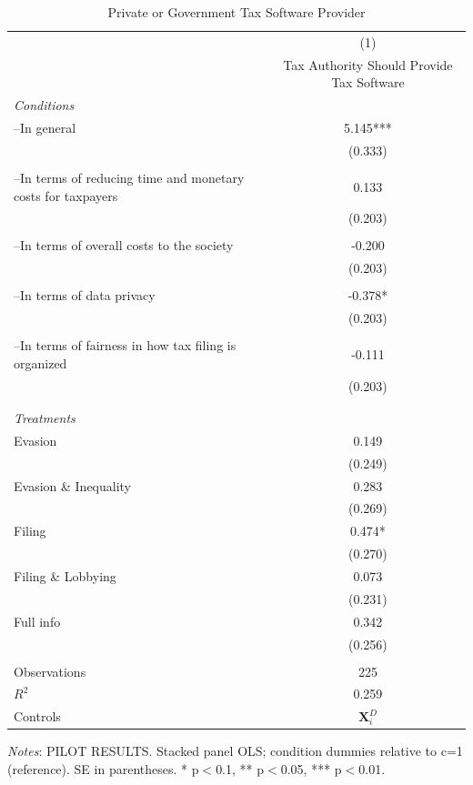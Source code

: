 \documentclass[11pt]{article}
\begin{document}
\FloatBarrier
\begin{table}[!htbp]\centering
\caption{Private or Government Tax Software Provider}
\label{tab:taxsoftwareprovider_c}
\begin{threeparttable}
\footnotesize
\begin{tabular}{l|c}
\toprule
 & (1)\\
 & Tax Authority Should Provide Tax Software \\
\midrule
\textit{Conditions} \\[0.25em]
--In general & 5.145*** \\
 & (0.333) \\\\[0.25em]
--In terms of reducing time and monetary costs for taxpayers & 0.133 \\
 & (0.203) \\\\[0.25em]
--In terms of overall costs to the society & -0.200 \\
 & (0.203) \\\\[0.25em]
--In terms of data privacy & -0.378* \\
 & (0.203) \\\\[0.25em]
--In terms of fairness in how tax filing is organized & -0.111 \\
 & (0.203) \\\\[0.25em]
\\[1em]
\textit{Treatments} \\[0.25em]
Evasion & 0.149 \\
 & (0.249) \\
Evasion \& Inequality & 0.283 \\
 & (0.269) \\
Filing & 0.474* \\
 & (0.270) \\
Filing \& Lobbying & 0.073 \\
 & (0.231) \\
Full info & 0.342 \\
 & (0.256) \\
\\[0.5em]
\midrule
Observations & 225 \\
$R^2$ & 0.259 \\
Controls & $\mathbf{X}_{i}^{D}$ \\
\bottomrule
\end{tabular}
\begin{tablenotes}[flushleft]
\footnotesize
\item \textit{Notes}: PILOT RESULTS. Stacked panel OLS; condition dummies relative to c=1 (reference). SE in parentheses. * p$<$0.1, ** p$<$0.05, *** p$<$0.01.
\end{tablenotes}
\end{threeparttable}
\end{table}
\end{document}
